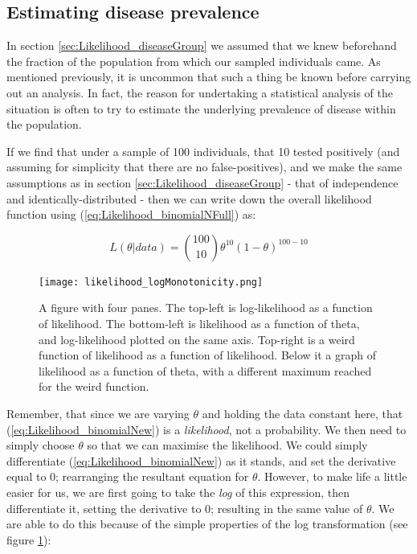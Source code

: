 \documentclass[11pt,fullpage]{book}
\begin{document}
\subsection{Estimating disease prevalence}\label{sec:Likelihood_diseaseMLE}
In section \ref{sec:Likelihood_diseaseGroup} we assumed that we knew beforehand the fraction of the population from which our sampled individuals came. As mentioned previously, it is uncommon that such a thing be known before carrying out an analysis. In fact, the reason for undertaking a statistical analysis of the situation is often to try to estimate the underlying prevalence of disease within the population.

If we find that under a sample of 100 individuals, that 10 tested positively (and assuming for simplicity that there are no false-positives), and we make the same assumptions as in section \ref{sec:Likelihood_diseaseGroup} - that of independence and identically-distributed - then we can write down the overall likelihood function using (\ref{eq:Likelihood_binomialNFull}) as:

\begin{equation}\label{eq:Likelihood_binomialNew}
L(\theta|data) = {100 \choose 10} \theta^{10} (1-\theta)^{100-10}
\end{equation}

\begin{figure}
\centering
\scalebox{0.75} 
{\texttt{[image: likelihood\_logMonotonicity.png]}}
\caption{A figure with four panes. The top-left is log-likelihood as a function of likelihood. The bottom-left is likelihood as a function of theta, and log-likelihood plotted on the same axis. Top-right is a weird function of likelihood as a function of likelihood. Below it a graph of likelihood as a function of theta, with a different maximum reached for the weird function.}\label{fig:Likelihood_logMonotonicity}
\end{figure}

Remember, that since we are varying $\theta$ and holding the data constant here, that (\ref{eq:Likelihood_binomialNew}) is a \textit{likelihood}, not a probability. We then need to simply choose $\theta$ so that we can maximise the likelihood. We could simply differentiate (\ref{eq:Likelihood_binomialNew}) as it stands, and set the derivative equal to 0; rearranging the resultant equation for $\theta$. However, to make life a little easier for us, we are first going to take the \textit{log} of this expression, then differentiate it, setting the derivative to 0; resulting in the same value of $\theta$. We are able to do this because of the simple properties of the log transformation (see figure \ref{fig:Likelihood_logMonotonicity}):
\end{document}
